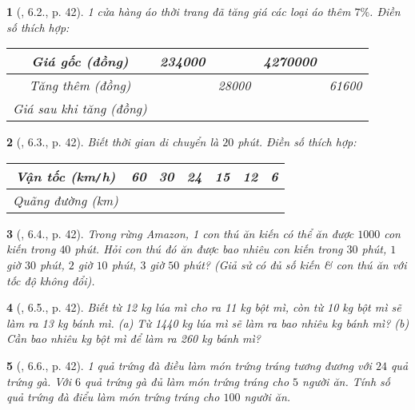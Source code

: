 \documentclass{article}
\newtheorem{baitoan}{}
\begin{document}
\begin{baitoan}[\cite{Binh_boi_duong_Toan_7_tap_1}, 6.2., p. 42]
	1 cửa hàng áo thời trang đã tăng giá các loại áo thêm $7\%$. Điền số thích hợp:
	\begin{table}[H]
		\centering
		\begin{tabular}{|c|c|c|c|c|}
			\hline
			Giá gốc (đồng) & 234000 &  & 4270000 &  \\
			\hline
			Tăng thêm (đồng) &  & 28000 &  & 61600 \\
			\hline
			Giá sau khi tăng (đồng) &  &  &  &  \\
			\hline
		\end{tabular}
	\end{table}
\end{baitoan}

\begin{baitoan}[\cite{Binh_boi_duong_Toan_7_tap_1}, 6.3., p. 42]
	Biết thời gian di chuyển là $20$ phút. Điền số thích hợp:
	\begin{table}[H]
		\centering
		\begin{tabular}{|c|c|c|c|c|c|c|}
			\hline
			Vận tốc (km{\tt/}h) & 60 & 30 & 24 & 15 & 12 & 6 \\
			\hline
			Quãng đường (km) &  &  &  &  &  &  \\
			\hline
		\end{tabular}
	\end{table}
\end{baitoan}

\begin{baitoan}[\cite{Binh_boi_duong_Toan_7_tap_1}, 6.4., p. 42]
	Trong rừng Amazon, 1 con thú ăn kiến có thể ăn được $1000$ con kiến trong $40$ phút. Hỏi con thú đó ăn được bao nhiêu con kiến trong $30$ phút, $1$ giờ $30$ phút, $2$ giờ $10$ phút, $3$ giờ $50$ phút? (Giả sử có đủ số kiến \& con thú ăn với tốc độ không đổi).
\end{baitoan}

\begin{baitoan}[\cite{Binh_boi_duong_Toan_7_tap_1}, 6.5., p. 42]
	Biết từ {\rm12 kg} lúa mì cho ra {\rm11 kg} bột mì, còn từ {\rm10 kg} bột mì sẽ làm ra {\rm13 kg} bánh mì. (a) Từ {\rm1440 kg} lúa mì sẽ làm ra bao nhiêu {\rm kg} bánh mì? (b) Cần bao nhiêu {\rm kg} bột mì để làm ra {\rm260 kg} bánh mì?
\end{baitoan}

\begin{baitoan}[\cite{Binh_boi_duong_Toan_7_tap_1}, 6.6., p. 42]
	1 quả trứng đà điều làm món trứng tráng tương đương với $24$ quả trứng gà. Với $6$ quả trứng gà đủ làm món trứng tráng cho $5$ người ăn. Tính số quả trứng đà điểu làm món trứng tráng cho $100$ người ăn.
\end{baitoan}
\end{document}
